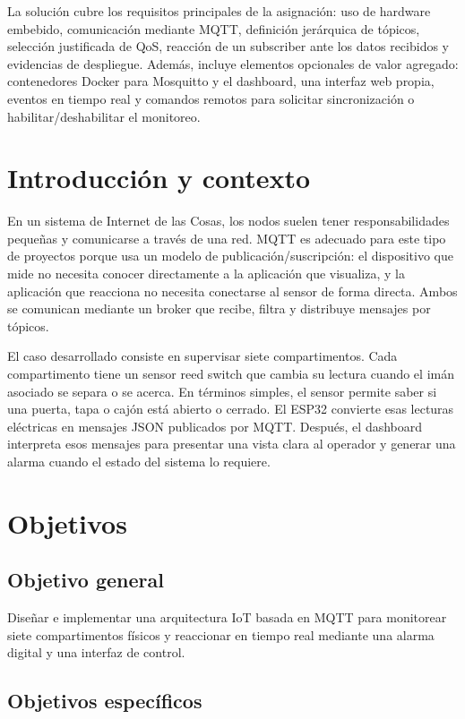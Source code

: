 \documentclass[12pt,letterpaper]{article}
\begin{document}
La solución cubre los requisitos principales de la asignación: uso de hardware embebido, comunicación mediante MQTT, definición jerárquica de tópicos, selección justificada de QoS, reacción de un subscriber ante los datos recibidos y evidencias de despliegue. Además, incluye elementos opcionales de valor agregado: contenedores Docker para Mosquitto y el dashboard, una interfaz web propia, eventos en tiempo real y comandos remotos para solicitar sincronización o habilitar/deshabilitar el monitoreo.

\section{Introducción y contexto}

En un sistema de Internet de las Cosas, los nodos suelen tener responsabilidades pequeñas y comunicarse a través de una red. MQTT es adecuado para este tipo de proyectos porque usa un modelo de publicación/suscripción: el dispositivo que mide no necesita conocer directamente a la aplicación que visualiza, y la aplicación que reacciona no necesita conectarse al sensor de forma directa. Ambos se comunican mediante un broker que recibe, filtra y distribuye mensajes por tópicos.

El caso desarrollado consiste en supervisar siete compartimentos. Cada compartimento tiene un sensor reed switch que cambia su lectura cuando el imán asociado se separa o se acerca. En términos simples, el sensor permite saber si una puerta, tapa o cajón está abierto o cerrado. El ESP32 convierte esas lecturas eléctricas en mensajes JSON publicados por MQTT. Después, el dashboard interpreta esos mensajes para presentar una vista clara al operador y generar una alarma cuando el estado del sistema lo requiere.

\section{Objetivos}

\subsection{Objetivo general}

Diseñar e implementar una arquitectura IoT basada en MQTT para monitorear siete compartimentos físicos y reaccionar en tiempo real mediante una alarma digital y una interfaz de control.

\subsection{Objetivos específicos}
\end{document}
